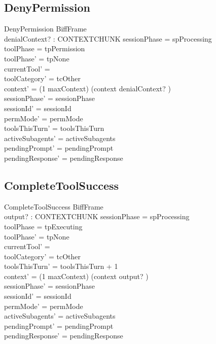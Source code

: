 \documentclass[a4paper,10pt,fleqn]{article}
\begin{document}
\subsection{DenyPermission}

\begin{schema}{DenyPermission}
  BiffFrame \\
  denialContext? : CONTEXTCHUNK
  \where
  sessionPhase = spProcessing \\
  toolPhase = tpPermission \\
  toolPhase' = tpNone \\
  currentTool' = \emptyset \\
  toolCategory' = tcOther \\
  context' = (1 \upto maxContext) \dres (context \cat \langle denialContext? \rangle) \\
  sessionPhase' = sessionPhase \\
  sessionId' = sessionId \\
  permMode' = permMode \\
  toolsThisTurn' = toolsThisTurn \\
  activeSubagents' = activeSubagents \\
  pendingPrompt' = pendingPrompt \\
  pendingResponse' = pendingResponse
\end{schema}

\subsection{CompleteToolSuccess}

\begin{schema}{CompleteToolSuccess}
  BiffFrame \\
  output? : CONTEXTCHUNK
  \where
  sessionPhase = spProcessing \\
  toolPhase = tpExecuting \\
  toolPhase' = tpNone \\
  currentTool' = \emptyset \\
  toolCategory' = tcOther \\
  toolsThisTurn' = toolsThisTurn + 1 \\
  context' = (1 \upto maxContext) \dres (context \cat \langle output? \rangle) \\
  sessionPhase' = sessionPhase \\
  sessionId' = sessionId \\
  permMode' = permMode \\
  activeSubagents' = activeSubagents \\
  pendingPrompt' = pendingPrompt \\
  pendingResponse' = pendingResponse
\end{schema}
\end{document}
